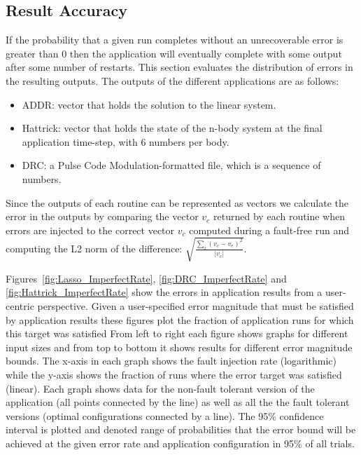 \documentclass{sig-alternate}
\begin{document}

\subsection{Result Accuracy}
\label{sec:eval:acc}


If the probability that a given run completes without an unrecoverable error is greater than 0 then the application will eventually complete with some output after some number of restarts.
This section evaluates the distribution of errors in the resulting outputs.
The outputs of the different applications are as follows:
\begin{itemize}
    \item ADDR: vector that holds the solution to the linear system.
    \item Hattrick: vector that holds the state of the n-body system at the final application time-step, with 6 numbers per body.
    \item DRC: a Pulse Code Modulation-formatted file, which is a sequence of numbers.
\end{itemize}
Since the outputs of each routine can be represented as vectors we calculate the error in the outputs by comparing the vector $v_e$ returned by each routine when errors are injected to the correct vector $v_c$ computed during a fault-free run and computing the L2 norm of the difference: $\sqrt{\frac{\sum_{i} (v_c-v_e)^2}{\left| v_c \right|}}$.

Figures~\ref{fig:Lasso_ImperfectRate}, \ref{fig:DRC_ImperfectRate} and \ref{fig:Hattrick_ImperfectRate} show the errors in application results from a user-centric perspective.
Given a user-specified error magnitude that must be satisfied by application results these figures plot the fraction of application runs for which this target was satisfied
From left to right each figure shows graphs for different input sizes and from top to bottom it shows results for different error magnitude bounds.
The x-axis in each graph shows the fault injection rate (logarithmic) while the y-axis shows the fraction of runs where the error target was satisfied (linear).
Each graph shows data for the non-fault tolerant version of the application (all points connected by the line) as well as all the the fault tolerant versions (optimal configurations connected by a line).
The 95\% confidence interval is plotted and denoted range of probabilities that the error bound will be achieved at the given error rate and application configuration in 95\% of all trials.
\end{document}
